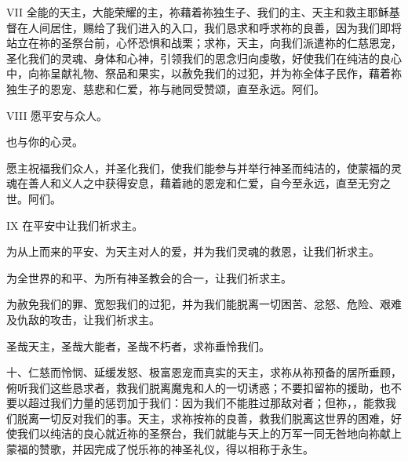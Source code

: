 \par

VII 全能的天主，大能荣耀的主，祢藉着祢独生子、我们的主、天主和救主耶稣基督在人间居住，赐给了我们进入的入口，我们恳求和呼求祢的良善，因为我们即将站立在祢的圣祭台前，心怀恐惧和战栗；求祢，天主，向我们派遣祢的仁慈恩宠，圣化我们的灵魂、身体和心神，引领我们的思念归向虔敬，好使我们在纯洁的良心中，向祢呈献礼物、祭品和果实，以赦免我们的过犯，并为祢全体子民作，藉着祢独生子的恩宠、慈悲和仁爱，祢与祂同受赞颂，直至永远。阿们。\par

\par

VIII 愿平安与众人。\par

\par

也与你的心灵。\par

\par

愿主祝福我们众人，并圣化我们，使我们能参与并举行神圣而纯洁的，使蒙福的灵魂在善人和义人之中获得安息，藉着祂的恩宠和仁爱，自今至永远，直至无穷之世。阿们。\par

\par

IX 在平安中让我们祈求主。\par

为从上而来的平安、为天主对人的爱，并为我们灵魂的救恩，让我们祈求主。\par

为全世界的和平、为所有神圣教会的合一，让我们祈求主。\par

为赦免我们的罪、宽恕我们的过犯，并为我们能脱离一切困苦、忿怒、危险、艰难及仇敌的攻击，让我们祈求主。\par

\par

圣哉天主，圣哉大能者，圣哉不朽者，求祢垂怜我们。\par

\par

十、仁慈而怜悯、延缓发怒、极富恩宠而真实的天主，求祢从祢预备的居所垂顾，俯听我们这些恳求者，救我们脱离魔鬼和人的一切诱惑；不要扣留祢的援助，也不要以超过我们力量的惩罚加于我们：因为我们不能胜过那敌对者；但祢，，能救我们脱离一切反对我们的事。天主，求祢按祢的良善，救我们脱离这世界的困难，好使我们以纯洁的良心就近祢的圣祭台，我们就能与天上的万军一同无咎地向祢献上蒙福的赞歌，并因完成了悦乐祢的神圣礼仪，得以相称于永生。\par

